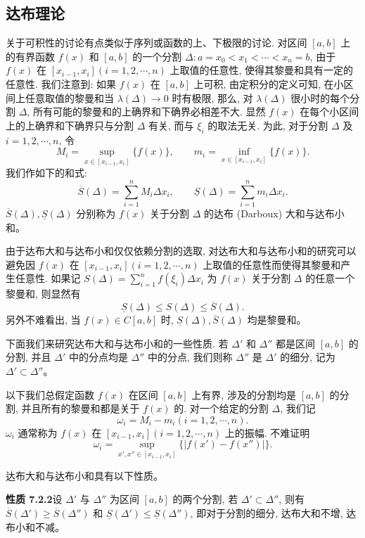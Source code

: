\documentclass[UTF8, 12pt, fontset=fandol, oneside]{ctexart}
\begin{document}
\subsection{达布理论}

关于可积性的讨论有点类似于序列或函数的上、下极限的讨论. 对区间 $[a,b]$ 上的有界函数 $f(x)$ 和 $[a,b]$ 的一个分割 $\Delta:a=x_0<x_1<\cdots<x_n=b$, 由于 $f(x)$ 在 $[x_{i-1},x_i](i=1,2,\cdots,n)$ 上取值的任意性, 使得其黎曼和具有一定的任意性. 我们注意到: 如果 $f(x)$ 在 $[a,b]$ 上可积, 由定积分的定义可知, 在小区间上任意取值的黎曼和当 $\lambda(\Delta)\to0$ 时有极限, 那么, 对 $\lambda(\Delta)$ 很小时的每个分割 $\Delta$, 所有可能的黎曼和的上确界和下确界必相差不大. 显然 $f(x)$ 在每个小区间上的上确界和下确界只与分割 $\Delta$ 有关, 而与 $\xi_i$ 的取法无关. 为此, 对于分割 $\Delta$ 及 $i=1,2,\cdots,n$, 令
\[
  M_i=\sup_{x\in[x_{i-1},x_i]}\{f(x)\},\qquad
  m_i=\inf_{x\in[x_{i-1},x_i]}\{f(x)\}.
\]
我们作如下的和式:
\[
  \overline S(\Delta)=\sum_{i=1}^n M_i\Delta x_i,\qquad
  \underline S(\Delta)=\sum_{i=1}^n m_i\Delta x_i.
\]
$\overline S(\Delta),\underline S(\Delta)$ 分别称为 $f(x)$ 关于分割 $\Delta$ 的达布 (Darboux) 大和与达布小和。

由于达布大和与达布小和仅仅依赖分割的选取, 对达布大和与达布小和的研究可以避免因 $f(x)$ 在 $[x_{i-1},x_i](i=1,2,\cdots,n)$ 上取值的任意性而使得其黎曼和产生任意性. 如果记 $S(\Delta)=\sum\limits_{i=1}^n f(\xi_i)\Delta x_i$ 为 $f(x)$ 关于分割 $\Delta$ 的任意一个黎曼和, 则显然有
\[
  \underline S(\Delta)\leq S(\Delta)\leq \overline S(\Delta).
\]
另外不难看出, 当 $f(x)\in C[a,b]$ 时, $\underline S(\Delta),\overline S(\Delta)$ 均是黎曼和。

下面我们来研究达布大和与达布小和的一些性质. 若 $\Delta'$ 和 $\Delta''$ 都是区间 $[a,b]$ 的分割, 并且 $\Delta'$ 中的分点均是 $\Delta''$ 中的分点, 我们则称 $\Delta''$ 是 $\Delta'$ 的细分, 记为 $\Delta'\subset\Delta''$。

以下我们总假定函数 $f(x)$ 在区间 $[a,b]$ 上有界, 涉及的分割均是 $[a,b]$ 的分割, 并且所有的黎曼和都是关于 $f(x)$ 的. 对一个给定的分割 $\Delta$, 我们记
\[
  \omega_i=M_i-m_i(i=1,2,\cdots,n).
\]
$\omega_i$ 通常称为 $f(x)$ 在 $[x_{i-1},x_i](i=1,2,\cdots,n)$ 上的振幅. 不难证明
\[
  \omega_i=\sup_{x',x''\in[x_{i-1},x_i]}\{|f(x')-f(x'')|\}.
\]

达布大和与达布小和具有以下性质。

\noindent\textbf{性质 7.2.2}\quad 设 $\Delta'$ 与 $\Delta''$ 为区间 $[a,b]$ 的两个分割, 若 $\Delta'\subset\Delta''$, 则有 $\overline S(\Delta')\geq\overline S(\Delta'')$ 和 $\underline S(\Delta')\leq\underline S(\Delta'')$, 即对于分割的细分, 达布大和不增, 达布小和不减。
\end{document}
